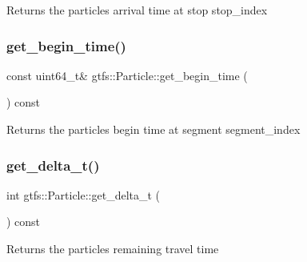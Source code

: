 \begin{DoxyReturn}{Returns}
the particle\textquotesingle{}s arrival time at stop {\ttfamily stop\+\_\+index} 
\end{DoxyReturn}
\mbox{\label{classgtfs_1_1Particle_ac4c8fd3566b0178c95daf6a0cba0040e}} 
\subsubsection{\texorpdfstring{get\+\_\+begin\+\_\+time()}{get\_begin\_time()}}
{\footnotesize\ttfamily const uint64\+\_\+t\& gtfs\+::\+Particle\+::get\+\_\+begin\+\_\+time (\begin{DoxyParamCaption}{ }\end{DoxyParamCaption}) const\hspace{0.3cm}{\ttfamily [inline]}}

\begin{DoxyReturn}{Returns}
the particle\textquotesingle{}s begin time at segment {\ttfamily segment\+\_\+index} 
\end{DoxyReturn}
\mbox{\label{classgtfs_1_1Particle_ae2029ee7ae66a92a8a2f08e4290daa73}} 
\subsubsection{\texorpdfstring{get\+\_\+delta\+\_\+t()}{get\_delta\_t()}}
{\footnotesize\ttfamily int gtfs\+::\+Particle\+::get\+\_\+delta\+\_\+t (\begin{DoxyParamCaption}{ }\end{DoxyParamCaption}) const\hspace{0.3cm}{\ttfamily [inline]}}

\begin{DoxyReturn}{Returns}
the particle\textquotesingle{}s remaining travel time 
\end{DoxyReturn}
\mbox{\label{classgtfs_1_1Particle_a0ec3ee5a83e778069946242a6d7731b6}} 
